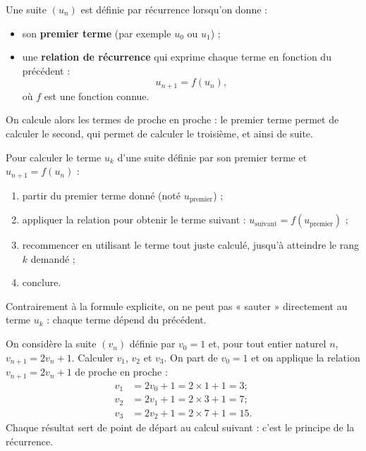 \documentclass[11pt]{article}
\newcommand{\cle}[1]{{\popxbold\color{popdark}#1}}
\begin{document}
\begin{definition}
Une suite $(u_n)$ est définie par \cle{récurrence} lorsqu'on donne :
\begin{itemize}
\item son \textbf{premier terme} (par exemple $u_0$ ou $u_1$) ;
\item une \textbf{relation de récurrence} qui exprime chaque terme en fonction du précédent :
\[
u_{n+1} = f(u_n),
\]
où $f$ est une fonction connue.
\end{itemize}
On calcule alors les termes \cle{de proche en proche} : le premier terme permet de calculer le second, qui permet de calculer le troisième, et ainsi de suite.
\end{definition}

\begin{methode}
Pour calculer le terme $u_k$ d'une suite définie par son premier terme et $u_{n+1} = f(u_n)$ :
\begin{enumerate}
\item partir du premier terme donné (noté $u_{\text{premier}}$) ;
\item appliquer la relation pour obtenir le terme suivant : $u_{\text{suivant}} = f(u_{\text{premier}})$ ;
\item recommencer en utilisant le terme tout juste calculé, jusqu'à atteindre le rang $k$ demandé ;
\item conclure.
\end{enumerate}
Contrairement à la formule explicite, on ne peut pas « sauter » directement au terme $u_k$ : chaque terme dépend du précédent.
\end{methode}

\begin{exoresolu}
On considère la suite $(v_n)$ définie par $v_0 = 1$ et, pour tout entier naturel $n$, $v_{n+1} = 2v_n + 1$. Calculer $v_1$, $v_2$ et $v_3$.
\tcblower
On part de $v_0 = 1$ et on applique la relation $v_{n+1} = 2v_n + 1$ de proche en proche :
\begin{align*}
v_1 &= 2v_0 + 1 = 2 \times 1 + 1 = 3 ;\\
v_2 &= 2v_1 + 1 = 2 \times 3 + 1 = 7 ;\\
v_3 &= 2v_2 + 1 = 2 \times 7 + 1 = 15.
\end{align*}
Chaque résultat sert de point de départ au calcul suivant : c'est le principe de la récurrence.
\end{exoresolu}
\end{document}
